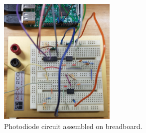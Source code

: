 \documentclass[paper-main.tex]{subfiles}
\begin{document}
\begin{figure}%
	\includegraphics[width=0.5\textwidth]{figures/circuit_pic3.pdf}
	\caption{\label{fig:circuit_pic3}
Photodiode circuit assembled on breadboard.
}
\end{figure}




\end{document}
